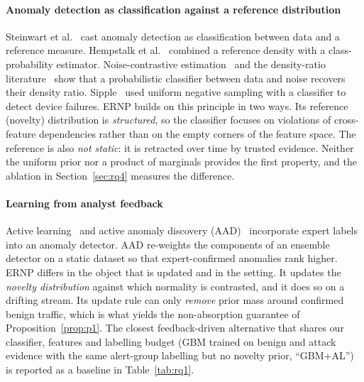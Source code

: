 \documentclass[preprint,12pt]{elsarticle}
\begin{document}
\paragraph{Anomaly detection as classification against a reference distribution}
Steinwart et al.~\cite{steinwart2005classification} cast anomaly detection as classification between data and a reference measure. Hempstalk et al.~\cite{hempstalk2008oneclass} combined a reference density with a class-probability estimator. Noise-contrastive estimation~\cite{gutmann2010nce} and the density-ratio literature~\cite{sugiyama2012density} show that a probabilistic classifier between data and noise recovers their density ratio. Sipple~\cite{sipple2020negative} used uniform negative sampling with a classifier to detect device failures. ERNP builds on this principle in two ways. Its reference (novelty) distribution is \emph{structured}, so the classifier focuses on violations of cross-feature dependencies rather than on the empty corners of the feature space. The reference is also \emph{not static}: it is retracted over time by trusted evidence. Neither the uniform prior nor a product of marginals provides the first property, and the ablation in Section~\ref{sec:rq4} measures the difference.

\paragraph{Learning from analyst feedback}
Active learning~\cite{settles2009active} and active anomaly discovery (AAD)~\cite{das2016aad,das2020expert} incorporate expert labels into an anomaly detector. AAD re-weights the components of an ensemble detector on a static dataset so that expert-confirmed anomalies rank higher. ERNP differs in the object that is updated and in the setting. It updates the \emph{novelty distribution} against which normality is contrasted, and it does so on a drifting stream. Its update rule can only \emph{remove} prior mass around confirmed benign traffic, which is what yields the non-absorption guarantee of Proposition~\ref{prop:p1}. The closest feedback-driven alternative that shares our classifier, features and labelling budget (GBM trained on benign and attack evidence with the same alert-group labelling but no novelty prior, ``GBM+AL'') is reported as a baseline in Table~\ref{tab:rq1}.
\end{document}
